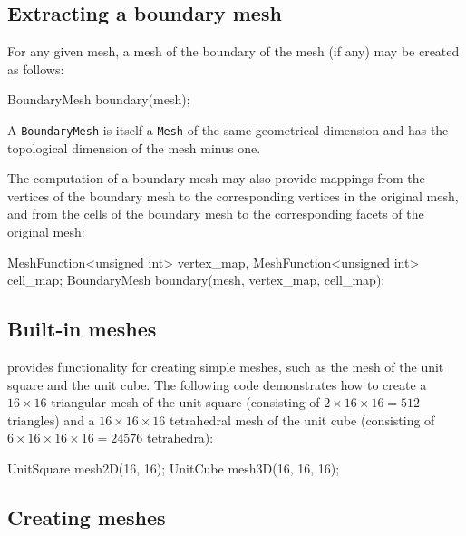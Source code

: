 \subsection{Extracting a boundary mesh}

For any given mesh, a mesh of the boundary of the mesh (if any) may be
created as follows:
\begin{code}
BoundaryMesh boundary(mesh);
\end{code}
A \texttt{BoundaryMesh} is itself a \texttt{Mesh} of the same
geometrical dimension and has the topological dimension of the mesh
minus one.

The computation of a boundary mesh may also provide mappings from the
vertices of the boundary mesh to the corresponding vertices in the
original mesh, and from the cells of the boundary mesh to the
corresponding facets of the original mesh:
\begin{code}
MeshFunction<unsigned int> vertex_map,
MeshFunction<unsigned int> cell_map;
BoundaryMesh boundary(mesh, vertex_map, cell_map);
\end{code}

\subsection{Built-in meshes}

\dolfin{} provides functionality for creating simple meshes, such as
the mesh of the unit square and the unit cube. The following code
demonstrates how to create a $16\times 16$ triangular mesh of the unit square
(consisting of $2\times 16\times 16 = 512$ triangles) and a
$16\times 16\times 16$ tetrahedral mesh of the unit cube (consisting
of $6\times 16\times 16\times 16 = 24576$ tetrahedra):
\begin{code}
UnitSquare mesh2D(16, 16);
UnitCube mesh3D(16, 16, 16);
\end{code}


\subsection{Creating meshes}

